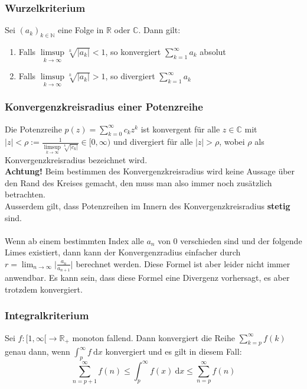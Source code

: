 \documentclass[a4paper,10pt]{scrartcl}
\newcommand{\diff}{\ \mathrm{d}}
\begin{document}
\subsubsection{Wurzelkriterium}
Sei $(a_k)_{k\in\mathbb{N}}$ eine Folge in $\mathbb{R}$ oder $\mathbb{C}$. Dann gilt: 
\begin{enumerate} [label=$\circ$]
	\item Falls $\displaystyle \limsup\limits_ {k\to \infty} \sqrt[k]{|a_k|}<1$, so konvergiert $\sum_{k=1}^{\infty} a_k$ absolut
	\item Falls $\displaystyle \limsup\limits_ {k\to \infty} \sqrt[k]{|a_k|}>1$, so divergiert $\sum_{k=1}^{\infty} a_k$
\end{enumerate}
\subsubsection{Konvergenzkreisradius einer Potenzreihe}
Die Potenzreihe $p(z)=\sum_{k=0}^{\infty} c_kz^k$ ist konvergent für alle $z\in\mathbb{C}$ mit 
$\displaystyle |z|<\rho:=\frac{1}{\limsup\limits_{k\to \infty} \sqrt[k]{|c_k|}}\in [0,\infty)$
und divergiert für alle $|z|>\rho$, wobei $\rho$ als Konvergenzkreisradius bezeichnet wird.\\
\textbf{Achtung!} Beim bestimmen des Konvergenzkreisradius wird keine Aussage über den Rand des Kreises gemacht, den muss man also immer noch zusätzlich betrachten. \\
Ausserdem gilt, dass Potenzreihen im Innern des Konvergenzkreisradius \textbf{stetig} sind.\\\\
Wenn ab einem bestimmten Index alle  $a_{n}$ von 0 verschieden sind und der folgende Limes existiert, dann kann der Konvergenzradius einfacher durch
$r=\lim _{{n\rightarrow \infty }}{\bigg |}{\frac  {a_{{n}}}{a_{{n+1}}}}{\bigg |}$
berechnet werden. Diese Formel ist aber leider nicht immer anwendbar. Es kann sein, dass diese Formel eine Divergenz vorhersagt, es aber trotzdem konvergiert. 
\subsubsection{Integralkriterium}
Sei $f:[1,\infty[ \to \mathbb{R}_+$ monoton fallend. Dann konvergiert die Reihe $\sum_{k=p}^{\infty} f(k)$ genau dann, wenn $\int_{p}^{\infty} f\diff x$ konvergiert und es gilt in diesem Fall: 
\begin{equation}
	\sum_{n=p+1}^\infty f(n) \leq \int_p^\infty f(x) \diff x \leq \sum_{n=p}^\infty f(n)
\end{equation}
\end{document}
